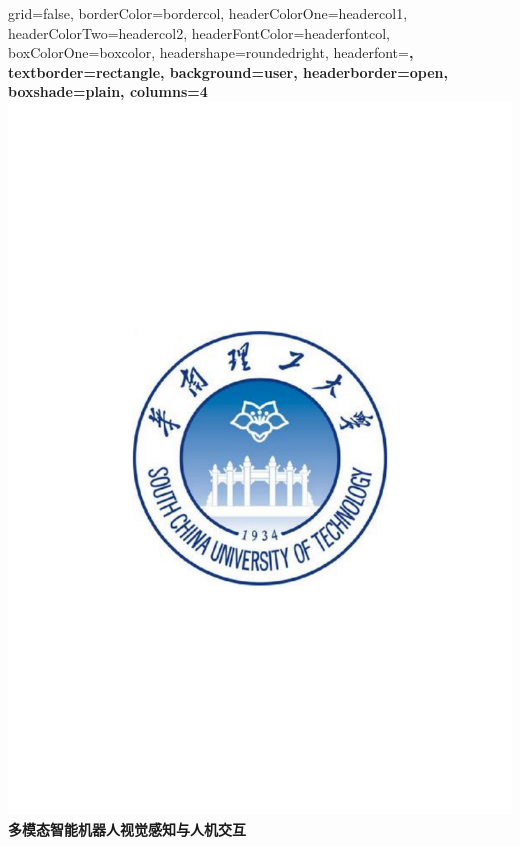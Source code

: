 \documentclass[a0paper,portrait]{baposter}
\begin{document}
\background{ %
}

\begin{poster}{
grid=false,
borderColor=bordercol, %
headerColorOne=headercol1, %
headerColorTwo=headercol2, %
headerFontColor=headerfontcol, %
boxColorOne=boxcolor, %
headershape=roundedright, %
headerfont=\Large\sf\bf, %
textborder=rectangle,
background=user,
headerborder=open, %
boxshade=plain,
columns=4
}
{
\includegraphics[scale=0.3]{figure/scut.pdf}
}
%
%
{ \bf  \huge \centering 多模态智能机器人视觉感知与人机交互} %
{\vspace{0.5em}}


\end{poster}
\end{document}
